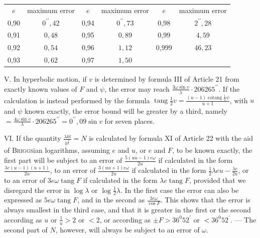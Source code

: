 \begin{center}
\begin{tabular}{c|c||c|c||c|c}
$e$ & maximum error & $e$ & maximum error & $e$ & maximum error \\
0,90 & $0^{\prime\prime}{,}42$ & 0,94 & $0^{\prime\prime}{,}73$ & 0,98 & $2^{\prime\prime}{,}28$ \\
0,91 & $0{,}48$ & 0,95 & $0{,}89$ & 0,99 & $4{,}59$ \\
0,92 & $0{,}54$ & 0,96 & $1{,}12$ & 0,999 & $46{,}23$ \\
0,93 & $0{,}62$ & 0,97 & $1{,}50$ & & \\
\end{tabular}
\end{center}

V. In hyperbolic motion, if $v$ is determined by formula III of Article 21 from exactly known values of $F$ and $\psi$, the error may reach $\frac{3\omega\sin v}{\lambda}\cdot206265^{\prime\prime}$. If the calculation is instead performed by the formula $\operatorname{tang}\frac{1}{2}v=\frac{(u-1)\operatorname{cotang}\frac{1}{2}\psi}{u+1}$, with $u$ and $\psi$ known exactly, the error bound will be greater by a third, namely $=\frac{4\omega\sin v}{\lambda}\cdot206265^{\prime\prime}=0^{\prime\prime}{,}09\sin v$ for seven places.

VI. If the quantity $\frac{\lambda kt}{b^{\frac{3}{2}}}=N$ is calculated by formula XI of Article 22 with the aid of \textsc{Briggs}ian logarithms, assuming $e$ and $u$, or $e$ and $F$, to be known exactly, the first part will be subject to an error of $\frac{5(uu-1)e\omega}{2u}$ if calculated in the form $\frac{\lambda e(u-1)(u+1)}{2u}$, to an error of $\frac{3(uu+1)e\omega}{2u}$ if calculated in the form $\frac{1}{2}\lambda eu-\frac{\lambda e}{2u}$, or to an error of $3e\omega\operatorname{tang}F$ if calculated in the form $\lambda e\operatorname{tang}F$, provided that we disregard the error in $\log\lambda$ or $\log\frac{1}{2}\lambda$. In the first case the error can also be expressed as
$5e\omega\operatorname{tang}F$, and in the second as $\frac{3e\omega}{\cos F}$. This shows that the error is always smallest in the third case, and that it is greater in the first or the second according as $u$ or $\frac{1}{u}>2$ or $<2$, or according as $\pm F>36^0 52^{\prime}$ or $<36^0 52^{\prime}$. — The second part of $N$, however, will always be subject to an error of $\omega$.

